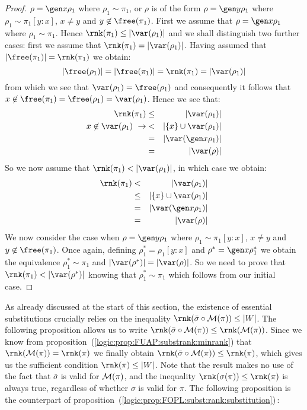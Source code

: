 \begin{proof}
$\rho=\gen x\rho_{1}$ where $\rho_{1}\sim\pi_{1}$, or $\rho$ is of
the form $\rho=\gen y\rho_{1}$ where $\rho_{1}\sim\pi_{1}[y\!:\!x]$,
$x\neq y$ and $y\not\in\free(\pi_{1})$. First we assume that
$\rho=\gen x\rho_{1}$ where $\rho_{1}\sim\pi_{1}$. Hence
$\rnk(\pi_{1})\leq|\var(\rho_{1})|$ and we shall distinguish two
further cases: first we assume that
$\rnk(\pi_{1})=|\var(\rho_{1})|$. Having assumed that
$|\free(\pi_{1})|=\rnk(\pi_{1})$ we obtain:
    \[
    |\free(\rho_{1})|=|\free(\pi_{1})|=\rnk(\pi_{1})=|\var(\rho_{1})|
    \]
from which we see that $\var(\rho_{1})=\free(\rho_{1})$ and
consequently it follows that
$x\not\in\free(\pi_{1})=\free(\rho_{1})=\var(\rho_{1})$. Hence we
see that:
    \begin{eqnarray*}
    \rnk(\pi_{1})&\leq&|\var(\rho_{1})|\\
    x\not\in\var(\rho_{1})\ \rightarrow
    &<&|\{x\}\cup\var(\rho_{1})|\\
    &=&|\var(\gen x\rho_{1})|\\
    &=&|\var(\rho)|
    \end{eqnarray*}
So we now assume that $\rnk(\pi_{1})<|\var(\rho_{1})|$, in which
case we obtain:
    \begin{eqnarray*}
    \rnk(\pi_{1})&<&|\var(\rho_{1})|\\
    &\leq&|\{x\}\cup\var(\rho_{1})|\\
    &=&|\var(\gen x\rho_{1})|\\
    &=&|\var(\rho)|
    \end{eqnarray*}
We now consider the case when $\rho=\gen y\rho_{1}$ where
$\rho_{1}\sim\pi_{1}[y\!:\!x]$, $x\neq y$ and
$y\not\in\free(\pi_{1})$. Once again, defining
$\rho_{1}^{*}=\rho_{1}[y\!:\!x]$ and $\rho^{*}=\gen x\rho_{1}^{*}$
we obtain the equivalence $\rho_{1}^{*}\sim\pi_{1}$ and
$|\var(\rho^{*})|=|\var(\rho)|$. So we need to prove that
$\rnk(\pi_{1})<|\var(\rho^{*})|$ knowing that
$\rho_{1}^{*}\sim\pi_{1}$ which follows from our initial case.
\end{proof}

As already discussed at the start of this section, the existence of
essential substitutions crucially relies on the inequality
$\rnk(\bar{\sigma}\circ{\cal M}(\pi))\leq |W|$. The following
proposition allows us to write $\rnk(\bar{\sigma}\circ{\cal
M}(\pi))\leq\rnk({\cal M}(\pi))$. Since we know from
proposition~(\ref{logic:prop:FUAP:substrank:minrank}) that
$\rnk({\cal M}(\pi))=\rnk(\pi)$ we finally obtain
$\rnk(\bar{\sigma}\circ{\cal M}(\pi))\leq\rnk(\pi)$, which gives us
the sufficient condition $\rnk(\pi)\leq |W|$. Note that the result
makes no use of the fact that $\bar{\sigma}$ is valid for ${\cal
M}(\pi)$, and the inequality $\rnk(\sigma(\pi))\leq\rnk(\pi)$ is
always true, regardless of whether $\sigma$ is valid for $\pi$. The
following proposition is the counterpart of
proposition~(\ref{logic:prop:FOPL:subst:rank:substitution})\,:

